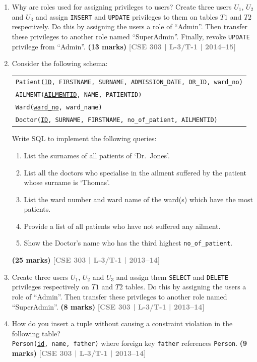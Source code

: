 \documentclass[12pt,a3paper]{article}
\newcommand{\yr}[1]{\hfill\textcolor{gray}{\small\textbf{[#1]}}}
\newcommand{\mk}[1]{\textcolor{orange!70!black}{\small\textbf{(#1 marks)}}}
\begin{document}
\begin{enumerate}
\item Why are roles used for assigning privileges to users? Create three users $U_1$, $U_2$ and $U_3$ and assign \texttt{INSERT} and \texttt{UPDATE} privileges to them on tables $T1$ and $T2$ respectively. Do this by assigning the users a role of ``Admin''. Then transfer these privileges to another role named ``SuperAdmin''. Finally, revoke \texttt{UPDATE} privilege from ``Admin''.
\mk{13} \yr{CSE 303 | L-3/T-1 | 2014--15}

\item Consider the following schema:
\begin{center}
\begin{tabular}{l}
\texttt{Patient(\underline{ID}, FIRSTNAME, SURNAME, ADMISSION\_DATE, DR\_ID, ward\_no)}\\
\texttt{AILMENT(\underline{AILMENTID}, NAME, PATIENTID)}\\
\texttt{Ward(\underline{ward\_no}, ward\_name)}\\
\texttt{Doctor(\underline{ID}, SURNAME, FIRSTNAME, no\_of\_patient, AILMENTID)}
\end{tabular}
\end{center}
Write SQL to implement the following queries:
\begin{enumerate}
  \item List the surnames of all patients of `Dr.\ Jones'.
  \item List all the doctors who specialise in the ailment suffered by the patient whose surname is `Thomas'.
  \item List the ward number and ward name of the ward(s) which have the most patients.
  \item Provide a list of all patients who have not suffered any ailment.
  \item Show the Doctor's name who has the third highest \texttt{no\_of\_patient}.
\end{enumerate}
\mk{25} \yr{CSE 303 | L-3/T-1 | 2013--14}

\item Create three users $U_1$, $U_2$ and $U_3$ and assign them \texttt{SELECT} and \texttt{DELETE} privileges respectively on $T1$ and $T2$ tables. Do this by assigning the users a role of ``Admin''. Then transfer these privileges to another role named ``SuperAdmin''.
\mk{8} \yr{CSE 303 | L-3/T-1 | 2013--14}

\item How do you insert a tuple without causing a constraint violation in the following table?\\
\texttt{Person(\underline{id}, name, father)} where foreign key \texttt{father} references \texttt{Person}.
\mk{9} \yr{CSE 303 | L-3/T-1 | 2013--14}


\end{enumerate}
\end{document}
